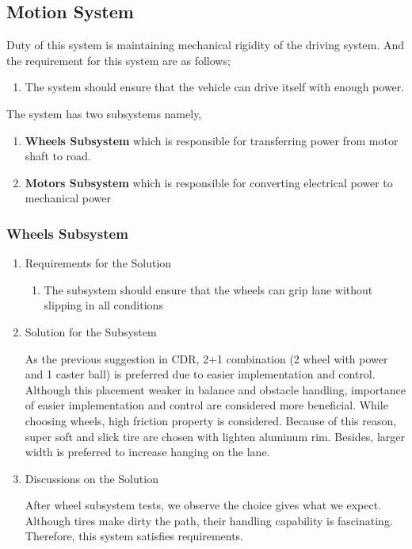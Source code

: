 \documentclass[a4paper,12pt]{article}
\begin{document}
	
	
	
		
		
		\subsection{Motion System}
				
		Duty of this system is maintaining mechanical rigidity of the driving system. And the requirement for this system are as follows;
		
		\begin{enumerate}
			\item The system should ensure that the vehicle can drive itself with enough power.	
		\end{enumerate}	
		
		
		The system has two subsystems namely,
			
			\begin{enumerate}
				\item \textbf{Wheels Subsystem} which is responsible for transferring power from motor shaft to road.
				\item \textbf{Motors Subsystem} which is responsible for converting electrical power to mechanical power
			\end{enumerate}
		
	\subsubsection{Wheels Subsystem}
	
		\begin{enumerate}
			\item {Requirements for the Solution}
			
			\begin{enumerate}
					\item The subsystem should ensure that the wheels can grip lane without slipping in all conditions 
			\end{enumerate}
	
	
			\item {Solution for the Subsystem}
			
			As the previous suggestion in CDR, 2+1 combination (2 wheel with power and 1 caster ball) is preferred due to easier implementation and control. Although this placement weaker in balance and obstacle handling, importance of easier implementation and control are considered more beneficial. 
While choosing wheels, high friction property is considered. Because of this reason, super soft and slick tire are chosen with lighten aluminum rim. Besides, larger width is preferred to increase hanging on the lane.      

			
			\item {Discussions on the Solution}
			
			After wheel subsystem tests, we observe the choice gives what we expect. Although tires make dirty the path, their handling capability is fascinating. Therefore, this system satisfies requirements.
			
		\end{enumerate}
		
\end{document}
